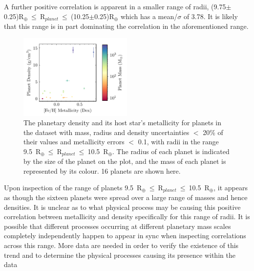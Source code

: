 \documentclass[a4paper,twocolumn,12pt]{article}
\begin{document}
A further positive correlation is apparent in a smaller range of radii, (9.75$\pm$0.25)R$_{\oplus}~\leq~$R$_{planet}~\leq~$(10.25$\pm$0.25)R$_{\oplus}$ which has a mean/$\sigma$ of 3.78. It is likely that this range is in part dominating the correlation in the aforementioned range.

\begin{figure}[h!]
    \centering
    \includegraphics[width=0.5\textwidth]{Graphs/FeH vs Density Planet Plot Radius 9.5 to 10.5.pdf}
    \caption{The planetary density and its host star's metallicity for planets in the dataset with mass, radius and density uncertainties $<$ 20\% of their values and metallicity errors $<$ 0.1, with radii in the range 9.5~R$_{\oplus}~\leq~$R$_{planet}~\leq~$10.5~R$_{\oplus}$. The radius of each planet is indicated by the size of the planet on the plot, and the mass of each planet is represented by its colour. 16 planets are shown here.}
    \label{figure: Fe/H vs Density correlations - Radii range 2}
\end{figure}

Upon inspection of the range of planets 9.5~R$_{\oplus}~\leq~$R$_{planet}~\leq~$10.5~R$_{\oplus}$, it appears as though the sixteen planets were spread over a large range of masses and hence densities. It is unclear as to what physical process may be causing this positive correlation between metallicity and density specifically for this range of radii. It is possible that different processes occurring at different planetary mass scales completely independently happen to appear in sync when inspecting correlations across this range.  More data are needed in order to verify the existence of this trend and to determine the physical processes causing its presence within the data

\end{document}
